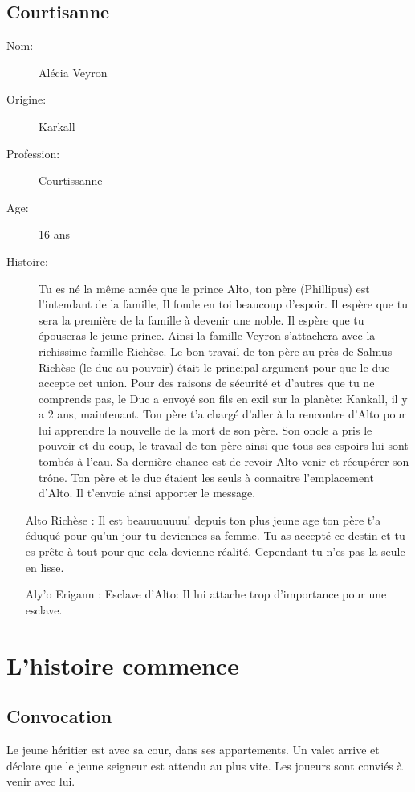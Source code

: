 \documentclass[oneside,12pt]{book}
\begin{document}
\begin{flushleft}
\section{Courtisanne}
\begin{description}
\item[Nom:]{Alécia Veyron}
\item[Origine:]{Karkall}
\item[Profession:]{Courtissanne}
\item[Age:]{16 ans}
\item[Histoire:]{
Tu es né la même année que le prince Alto, ton père (Phillipus) est l'intendant de la famille, Il fonde en toi beaucoup d'espoir. 
Il espère que tu sera la première de la famille à devenir une noble. Il espère que tu épouseras le jeune prince. Ainsi la famille Veyron s'attachera avec la richissime famille Richèse. 
Le bon travail de ton père au près de Salmus Richèse (le duc au pouvoir) était le principal argument pour que le duc accepte cet union. 
Pour des raisons de sécurité et d'autres que tu ne comprends pas, le Duc a envoyé son fils en exil sur la planète: Kankall, il y a 2 ans, maintenant. 
Ton père t'a chargé d'aller à la rencontre d'Alto pour lui apprendre la nouvelle de la mort de son père. 
Son oncle a pris le pouvoir et du coup, le travail de ton père ainsi que tous ses espoirs lui sont tombés à l'eau. 
Sa dernière chance est de revoir Alto venir et récupérer son trône. 
Ton père et le duc étaient les seuls à connaitre l'emplacement d'Alto. Il t'envoie ainsi apporter le message. 
}
\end{description}
		\begin{itemize}
		\item[Alto Richèse]: Il est beauuuuuuu! depuis ton plus jeune age ton père t'a éduqué pour qu'un jour tu deviennes sa femme. Tu as accepté ce destin et tu es prête à tout pour que cela devienne réalité. Cependant tu n'es pas la seule en lisse.  
		\item[Aly'o Erigann]: Esclave d'Alto: Il lui attache trop d'importance pour une esclave. 
	\end{itemize} 




\chapter{L'histoire commence}
\section{Convocation}
Le  jeune héritier est avec sa cour, dans ses appartements. Un valet arrive et déclare que le jeune seigneur est attendu au plus vite. 
Les joueurs sont conviés à venir avec lui. 


\end{flushleft}
\end{document}
